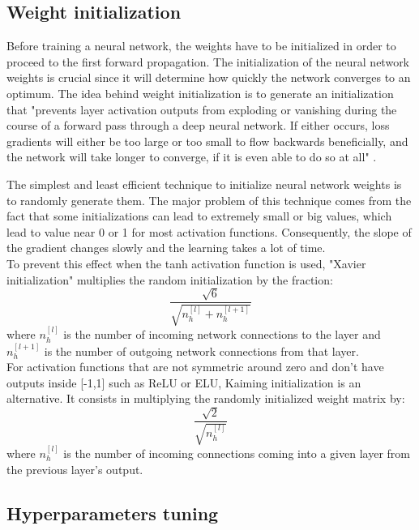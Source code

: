 \subsection{Weight initialization}
\label{weight_initialization}
\setlength{\marginparwidth}{3cm}\leavevmode {}Before training a neural network, the weights have to be initialized in order to proceed to the first forward propagation. The initialization of the neural network weights is crucial since it will determine how quickly the network converges to an optimum. The idea behind weight initialization is to generate an initialization that "prevents layer activation outputs from exploding or vanishing during the course of a forward pass through a deep neural network. If either occurs, loss gradients will either be too large or too small to flow backwards beneficially, and the network will take longer to converge, if it is even able to do so at all" \cite{27}.

The simplest and least efficient technique to initialize neural network weights is to randomly generate them. The major problem of this technique comes from the fact that some initializations can lead to extremely small or big values, which lead to value near 0 or 1 for most activation functions. Consequently, the slope of the gradient changes slowly and the learning takes a lot of time.\\
To prevent this effect when the tanh activation function is used, "Xavier initialization" multiplies the random initialization by the fraction:
\begin{equation}
\frac{\sqrt{6}}{\sqrt{n_{h}^{[l]}+n_{h}^{[l+1]}}}
\end{equation}
where $n_{h}^{[l]}$ is the number of incoming network connections to the layer and $n_{h}^{[l+1]}$ is the number of outgoing network connections from that layer.\\
For activation functions that are not symmetric around zero and don't have outputs inside [-1,1] such as ReLU or ELU, Kaiming initialization is an alternative. It consists in multiplying the randomly initialized  weight matrix by:
\begin{equation}
\frac{\sqrt{2}}{\sqrt{n_{h}^{[l]}}}
\end{equation} 
where $n_{h}^{[l]}$ is the number of incoming connections coming into a given layer from the previous layer's output.

\subsection{Hyperparameters tuning}

